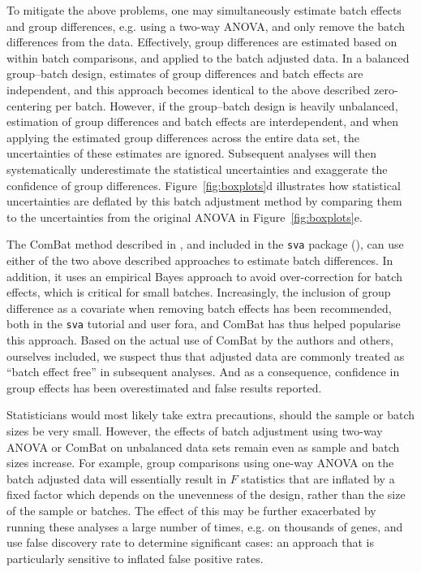 \documentclass{bio}
\begin{document}
To mitigate the above problems, one may simultaneously estimate batch effects and group differences, e.g. using a two-way ANOVA, and only remove the batch differences from the data. Effectively, group differences are estimated based on within batch comparisons, and applied to the batch adjusted data. In a balanced group--batch design, estimates of group differences and batch effects are independent, and this approach becomes identical to the above described zero-centering per batch. However, if the group--batch design is heavily unbalanced, estimation of group differences and batch effects are interdependent, and when applying the estimated group differences across the entire data set, the uncertainties of these estimates are ignored. Subsequent analyses will then systematically underestimate the statistical uncertainties and exaggerate the confidence of group differences. Figure~\ref{fig:boxplots}d illustrates how statistical uncertainties are deflated by this batch adjustment method by comparing them to the uncertainties from the original ANOVA in Figure~\ref{fig:boxplots}e.

The ComBat method described in \citet{Johnson2007}, and included in the \texttt{sva} package (\citealp{Leek2012}), can use either of the two above described approaches to estimate batch differences. In addition, it uses an empirical Bayes approach to avoid over-correction for batch effects, which is critical for small batches. Increasingly, the inclusion of group difference as a covariate when removing batch effects has been recommended, both in the \texttt{sva} tutorial and user fora, and ComBat has thus helped popularise this approach. Based on the actual use of ComBat by the authors and others, ourselves included, we suspect thus that adjusted data are commonly treated as ``batch effect free'' in subsequent analyses. And as a consequence, confidence in group effects has been overestimated and false results reported.

Statisticians would most likely take extra precautions, should the sample or batch sizes be very small. However, the effects of batch adjustment using two-way ANOVA or ComBat on unbalanced data sets remain even as sample and batch sizes increase. For example, group comparisons using one-way ANOVA on the batch adjusted data will essentially result in $F$ statistics that are inflated by a fixed factor which depends on the unevenness of the design, rather than the size of the sample or batches. The effect of this may be further exacerbated by running these analyses a large number of times, e.g. on thousands of genes, and use false discovery rate to determine significant cases: an approach that is particularly sensitive to inflated false positive rates.
\end{document}
